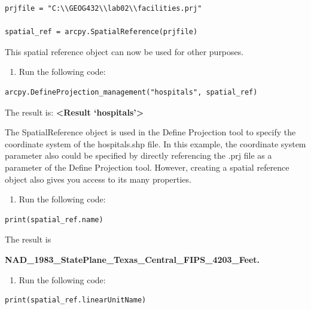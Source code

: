 \documentclass[
]{article}
\providecommand{\tightlist}{%
  \setlength{\itemsep}{0pt}\setlength{\parskip}{0pt}}
\begin{document}
\begin{verbatim}
prjfile = "C:\\GEOG432\\lab02\\facilities.prj"

spatial_ref = arcpy.SpatialReference(prjfile)
\end{verbatim}

This spatial reference object can now be used for other purposes.

\begin{enumerate}
\def\labelenumi{\arabic{enumi}.}
\setcounter{enumi}{6}
\tightlist
\item
  Run the following code:
\end{enumerate}

\begin{verbatim}
arcpy.DefineProjection_management("hospitals", spatial_ref) 
\end{verbatim}

The result is: \textbf{\textless Result `hospitals'\textgreater{}}

The SpatialReference object is used in the Define Projection tool to
specify the coordinate system of the hospitals.shp file. In this
example, the coordinate system parameter also could be specified by
directly referencing the .prj file as a parameter of the Define
Projection tool. However, creating a spatial reference object also gives
you access to its many properties.

\begin{enumerate}
\def\labelenumi{\arabic{enumi}.}
\setcounter{enumi}{7}
\tightlist
\item
  Run the following code:
\end{enumerate}

\begin{verbatim}
print(spatial_ref.name)
\end{verbatim}

The result is

\textbf{NAD\_1983\_StatePlane\_Texas\_Central\_FIPS\_4203\_Feet.}

\begin{enumerate}
\def\labelenumi{\arabic{enumi}.}
\setcounter{enumi}{8}
\tightlist
\item
  Run the following code:
\end{enumerate}

\begin{verbatim}
print(spatial_ref.linearUnitName)
\end{verbatim}
\end{document}
